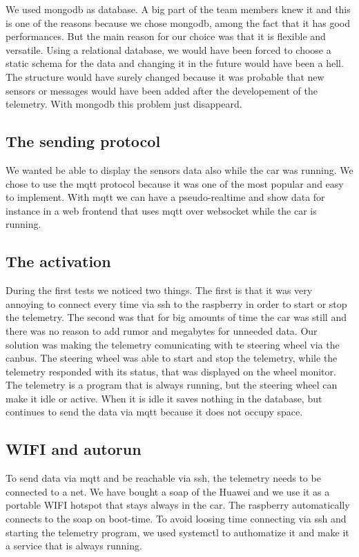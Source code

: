 We used mongodb as database. A big part of the team members knew it and this is one of the reasons because we chose mongodb, among the fact that 
it has good performances. But the main reason for our choice was that it is flexible and versatile. Using a relational database, we would have
been forced to choose a static schema for the data and changing it in the future would have been a hell. The structure would have surely changed
because it was probable that new sensors or messages would have been added after the developement of the telemetry. With mongodb this problem 
just disappeard.

\subsection{The sending protocol}

We wanted be able to display the sensors data also while the car was running. We chose to use the mqtt protocol because it was one of the most popular
and easy to implement. With mqtt we can have a pseudo-realtime and show data for instance in a web frontend that uses mqtt over websocket while the 
car is running.

\subsection{The activation}

During the first tests we noticed two things. The first is that it was very annoying to connect every time via ssh to the raspberry in order to 
start or stop the telemetry. The second was that for big amounts of time the car was still and there was no reason to add rumor and megabytes 
for unneeded data. Our solution was making the telemetry comunicating with te steering wheel via the canbus. The steering wheel was able to 
start and stop the telemetry, while the telemetry responded with its status, that was displayed on the wheel monitor. The telemetry is a program
that is always running, but the steering wheel can make it idle or active. When it is idle it saves nothing in the database, but continues to 
send the data via mqtt because it does not occupy space.

\subsection{WIFI and autorun}

To send data via mqtt and be reachable via ssh, the telemetry needs to be connected to a net. We have bought a soap of the Huawei and we use it 
as a portable WIFI hotspot that stays always in the car. The raspberry automatically connects to the soap on boot-time. To avoid loosing time
connecting via ssh and starting the telemetry program, we used systemctl to authomatize it and make it a service that is always running.

